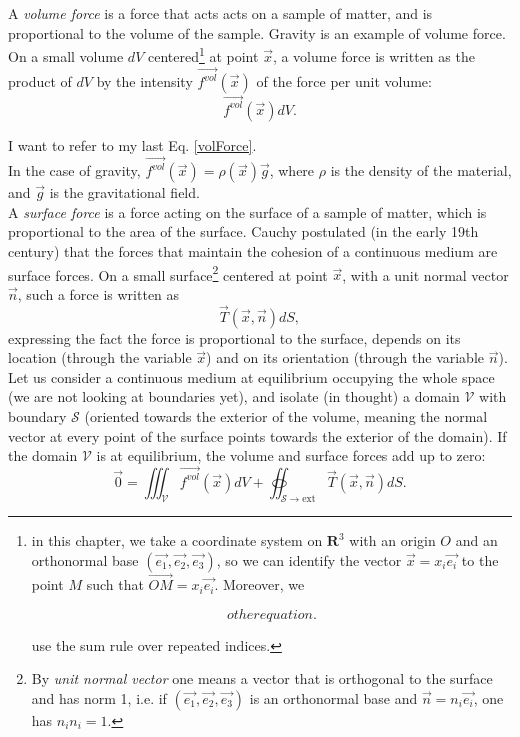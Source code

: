 \documentclass[DIV=12]{article}
\newcommand{\vol}{\mathcal{V}}
\newcommand{\surf}{{\mathcal{S}}}
\newcommand{\sExt}{{{\mathcal{S}}\rightarrow{\mathrm{ext}}}}
\newcommand{\fVol}{\overrightarrow{f^{vol}}}
\newcommand{\eBase}{(\vec{e_1}, \vec{e_2},\vec{e_3})}
\begin{document}
A {\emph{volume force}} is a force that acts
 acts on a sample of matter, and is proportional to the volume of the 
 sample. Gravity is an example of volume force. On a small volume $dV$ centered\footnote{in this chapter, we take a coordinate system on $\mathbf{R}^3$ 
 with an origin $O$ and an orthonormal base $\eBase$, so we can identify the vector $\vec{x}=x_i\vec{e_i}$ to the point $M$ such that $\overrightarrow{OM}= x_i\vec{e_i}$. Moreover, we

\begin{equation}
 other equation.
 \label{otherName}
\end{equation}

 use the sum rule over repeated indices.} at point $\vec{x}$,
 a volume force is written as the product of $dV$ by the intensity  $\fVol(\vec{x})$ of the 
 force per unit volume:
\begin{equation}
 \fVol (\vec{x}) dV.
 \label{volForce}
\end{equation}
 
 I want to refer to my last Eq. \ref{volForce}.\\



 In the case of gravity, $\fVol(\vec{x}) = \rho(\vec{x}) \vec{g}$, where $\rho$ is the density 
 of the material, and $\vec{g}$ is the gravitational field.\\

 A {\emph{surface force}} is a force acting on the surface
 of a sample of matter, which is proportional to the area of the 
 surface. Cauchy postulated (in the early 19th century) that the forces
 that maintain the cohesion of a continuous medium are surface forces.
  On a small surface\footnote{By {\emph{unit normal vector}} one means a vector that is orthogonal to the surface
 and has norm 1, i.e. if $\eBase$ is an orthonormal base and $\vec{n}=n_i\vec{e_i}$, one has $n_i n_i = 1$.} centered at point $\vec{x}$, with a unit normal 
 vector $\vec{n}$, such a force is written as
\begin{equation}
 \vec{T}( \vec{x},\vec{n} ) dS,
\label{surfForce}
\end{equation}
 expressing the fact the force is proportional to the surface, depends on its 
 location (through the variable $\vec{x}$) and on its orientation (through the variable $\vec{n}$). 
Let us consider a continuous medium at equilibrium occupying the whole space (we are not 
 looking at boundaries yet), and isolate (in thought) a domain $\vol$ with boundary $\surf$ (oriented towards
 the exterior of the volume, meaning the normal vector at every 
 point of the surface points towards the exterior of the domain). If the domain $\vol$
 is at equilibrium, the volume and surface 
forces add up to zero:
\begin{equation}
\boxed{ \vec{0} = \iiint_\vol \fVol (\vec{x}) dV + \oiint_\sExt \vec{T}( \vec{x},\vec{n} ) dS.}
\label{eqEquation}
\end{equation}
\end{document}
